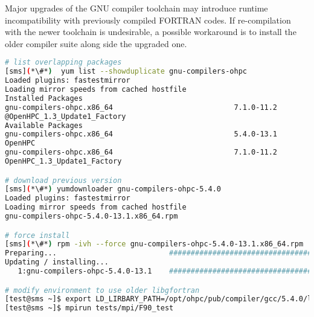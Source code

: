 \begin{center}
\begin{tcolorbox}[]
\small Major upgrades of the GNU compiler toolchain may introduce runtime 
incompatibility with previously compiled FORTRAN codes. If re-compilation with the 
newer toolchain is undesirable, a possible workaround is to install the older 
compiler suite along side the upgraded one.

\begin{lstlisting}[language=bash,keywords={}]
# list overlapping packages
[sms](*\#*)  yum list --showduplicate gnu-compilers-ohpc
Loaded plugins: fastestmirror
Loading mirror speeds from cached hostfile
Installed Packages
gnu-compilers-ohpc.x86_64                            7.1.0-11.2
@OpenHPC_1.3_Update1_Factory
Available Packages
gnu-compilers-ohpc.x86_64                            5.4.0-13.1
OpenHPC                     
gnu-compilers-ohpc.x86_64                            7.1.0-11.2
OpenHPC_1.3_Update1_Factory

# download previous version
[sms](*\#*) yumdownloader gnu-compilers-ohpc-5.4.0
Loaded plugins: fastestmirror
Loading mirror speeds from cached hostfile
gnu-compilers-ohpc-5.4.0-13.1.x86_64.rpm                                       |  44 MB  00:00:02     

# force install
[sms](*\#*) rpm -ivh --force gnu-compilers-ohpc-5.4.0-13.1.x86_64.rpm
Preparing...                          ################################# [100%]
Updating / installing...
   1:gnu-compilers-ohpc-5.4.0-13.1    ################################# [100%]

# modify environment to use older libgfortran
[test@sms ~]$ export LD_LIRBARY_PATH=/opt/ohpc/pub/compiler/gcc/5.4.0/lib64:${LD_LIBRARY_PATH}
[test@sms ~]$ mpirun tests/mpi/F90_test
\end{lstlisting}
\end{tcolorbox}
\end{center}
